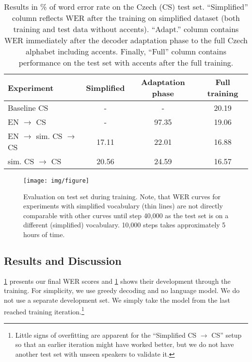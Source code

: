 \begin{table}[t]
	\small\centering
	\begin{tabular}{lc|cc}
		\bf Experiment & \bf Simplified & \bf Adaptation phase & \bf Full training \\
		\hline
		Baseline CS & - &  - &  20.19 \\
		EN $\rightarrow$ CS & -  & 97.35 &  19.06  \\
		EN $\rightarrow$ sim. CS $\rightarrow$ CS & 17.11  & 22.01 &  16.88 \\
		sim. CS $\rightarrow$ CS & 20.56  &  24.59 &  16.57  \\
	\end{tabular}
	\caption{Results in \% of word error rate on the Czech (CS) test set. ``Simplified''
    column reflects WER after the training on simplified dataset (both training and test data
    without accents). ``Adapt.'' column contains WER 
    immediately after the decoder adaptation phase to the full Czech alphabet including accents.
    Finally, ``Full'' column contains performance on the test set with accents 
    after the full training.}
	\label{tab:results}
\end{table}

\begin{landscape}
	\begin{figure}[t]
		\texttt{[image: img/figure]}
		\caption{Evaluation on test set during training. %
			Note, that WER curves for experiments with simplified vocabulary (thin lines) are not directly comparable with other curves until step 40,000 as the test set is on a different (simplified) vocabulary. 10,000 steps takes approximately 5 hours of time.}
		\label{fig:training}
	\end{figure}
\end{landscape}

\subsection{Results and Discussion}
\label{sec:results}


\cref{tab:results} presents our final WER scores and \cref{fig:training} shows their development through the training. For simplicity, we use greedy decoding and no language model. We do not use a separate development set. We simply take the model from the last reached training iteration.\footnote{Little signs of overfitting are apparent for the ``Simplified CS $\rightarrow$ CS'' setup so that an earlier iteration might have worked better, but we do not have another test set with unseen speakers to validate it.}

